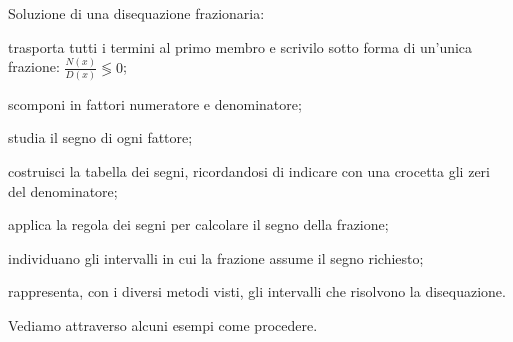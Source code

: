 \begin{procedura}
Soluzione di una disequazione frazionaria:
\begin{enumeratea}
\item trasporta tutti i termini al primo membro e scrivilo sotto forma di 
 un'unica frazione: $\frac{N(x)}{D(x)} \lessgtr 0$;
\item scomponi in fattori numeratore e denominatore;
\item studia il segno di ogni fattore;
\item costruisci la tabella dei segni, ricordandosi di indicare con una 
 crocetta gli zeri del denominatore;
\item applica la regola dei segni per calcolare il segno della frazione;
\item individuano gli intervalli in cui la frazione assume il segno richiesto;
\item rappresenta, con i diversi metodi visti, gli intervalli che 
 risolvono la disequazione.
\end{enumeratea}
\end{procedura}

Vediamo attraverso alcuni esempi come procedere.

